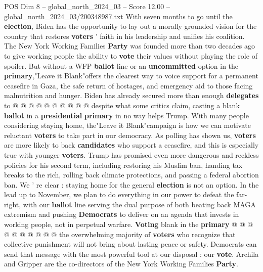 \begin{textsample}{POS Dim 8 – global\_north\_2024\_03 – Score 12.00 – global\_north\_2024\_03/200348987.txt}
With seven months to go until the \textbf{election}, Biden has the opportunity to lay out a morally grounded vision for the country that restores \textbf{voters} ' faith in his leadership and unifies his coalition.
The New York Working Families \textbf{Party} was founded more than two decades ago to give working people the ability to \textbf{vote} their values without playing the role of spoiler.
But without a WFP \textbf{ballot} line or an \textbf{uncommitted} option in the \textbf{primary},"Leave it Blank"offers the clearest way to voice support for a permanent ceasefire in Gaza, the safe return of hostages, and emergency aid to those facing malnutrition and hunger.
Biden has already secured more than enough \textbf{delegates} to @ @ @ @ @ @ @ @ @ @ despite what some critics claim, casting a blank \textbf{ballot} in a \textbf{presidential} \textbf{primary} in no way helps Trump.
With many people considering staying home, the"Leave it Blank"campaign is how we can motivate reluctant \textbf{voters} to take part in our democracy.
As polling has shown us, \textbf{voters} are more likely to back \textbf{candidates} who support a ceasefire, and this is especially true with younger \textbf{voters}.
Trump has promised even more dangerous and reckless policies for his second term, including restoring his Muslim ban, handing tax breaks to the rich, rolling back climate protections, and passing a federal abortion ban.
We ' re clear : staying home for the general \textbf{election} is not an option.
In the lead up to November, we plan to do everything in our power to defeat the far-right, with our \textbf{ballot} line serving the dual purpose of both beating back MAGA extremism and pushing \textbf{Democrats} to deliver on an agenda that invests in working people, not in perpetual warfare. \textbf{Voting} blank in the \textbf{primary} @ @ @ @ @ @ @ @ @ @ the overwhelming majority of \textbf{voters} who recognize that collective punishment will not bring about lasting peace or safety.
Democrats can send that message with the most powerful tool at our disposal : our \textbf{vote}.
Archila and Gripper are the co-directors of the New York Working Families \textbf{Party}.

\end{textsample}
